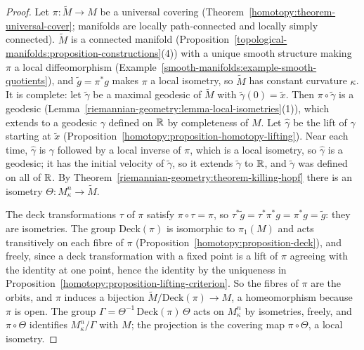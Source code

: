 \begin{proof}
Let $\pi \colon \widetilde{M} \to M$ be a universal covering (Theorem~\ref{homotopy:theorem-universal-cover}; manifolds are locally path-connected and locally simply
connected). $\widetilde{M}$ is a connected manifold (Proposition~\ref{topological-manifolds:proposition-constructions}(4)) with a unique smooth structure making $\pi$ a local
diffeomorphism (Example~\ref{smooth-manifolds:example-smooth-quotients}), and $\tilde g = \pi^*g$ makes $\pi$ a local isometry, so $\widetilde{M}$ has constant curvature
$\kappa$. It is complete: let $\tilde\gamma$ be a maximal geodesic of $\widetilde{M}$ with $\tilde\gamma(0) = \tilde x$. Then $\pi \circ \tilde\gamma$ is a geodesic
(Lemma~\ref{riemannian-geometry:lemma-local-isometries}(1)), which extends to a geodesic $\gamma$ defined on $\mathbb{R}$ by completeness of $M$. Let $\hat\gamma$ be the lift of
$\gamma$ starting at $\tilde x$ (Proposition~\ref{homotopy:proposition-homotopy-lifting}). Near each time, $\hat\gamma$ is $\gamma$ followed by a local inverse of $\pi$, which is a
local isometry, so $\hat\gamma$ is a geodesic; it has the initial velocity of $\tilde\gamma$, so it extends $\tilde\gamma$ to $\mathbb{R}$, and $\tilde\gamma$ was defined on all of
$\mathbb{R}$. By Theorem~\ref{riemannian-geometry:theorem-killing-hopf} there is an isometry $\Theta \colon M^n_\kappa \to \widetilde{M}$.

The deck transformations $\tau$ of $\pi$ satisfy $\pi \circ \tau = \pi$, so $\tau^*\tilde g = \tau^*\pi^*g = \pi^*g = \tilde g$: they are isometries. The group
$\mathrm{Deck}(\pi)$ is isomorphic to $\pi_1(M)$ and acts transitively on each fibre of $\pi$ (Proposition~\ref{homotopy:proposition-deck}), and freely, since a deck
transformation with a fixed point is a lift of $\pi$ agreeing with the identity at one point, hence the identity by the uniqueness in
Proposition~\ref{homotopy:proposition-lifting-criterion}.
So the fibres of $\pi$ are the orbits, and $\pi$ induces a bijection $\widetilde{M}/\mathrm{Deck}(\pi) \to M$, a homeomorphism because $\pi$ is open. The group
$\Gamma = \Theta^{-1}\,\mathrm{Deck}(\pi)\,\Theta$ acts on $M^n_\kappa$ by isometries, freely, and $\pi \circ \Theta$ identifies $M^n_\kappa/\Gamma$ with $M$; the projection is the
covering map $\pi \circ \Theta$, a local isometry.
\end{proof}

